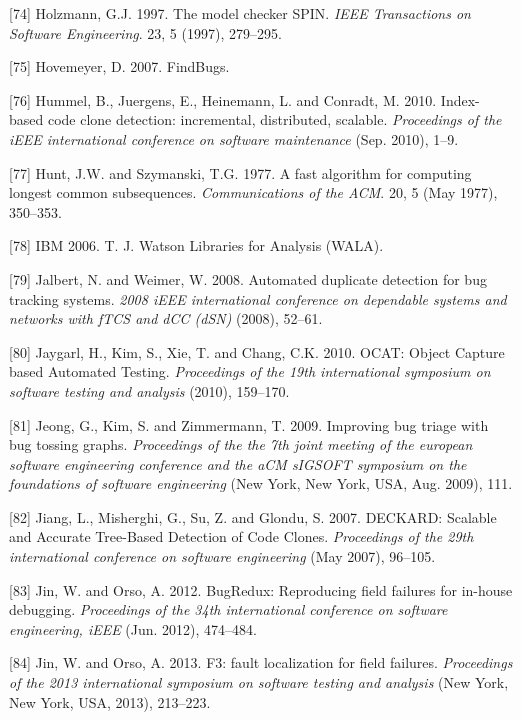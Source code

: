 \documentclass[12pt]{report}
\begin{document}
\hypertarget{ref-holzmann1997model}{}
{[}74{]} Holzmann, G.J. 1997. The model checker SPIN. \emph{IEEE
Transactions on Software Engineering}. 23, 5 (1997), 279--295.

\hypertarget{ref-Hovemeyer2007}{}
{[}75{]} Hovemeyer, D. 2007. FindBugs.

\hypertarget{ref-Hummel2010}{}
{[}76{]} Hummel, B., Juergens, E., Heinemann, L. and Conradt, M. 2010.
Index-based code clone detection: incremental, distributed, scalable.
\emph{Proceedings of the iEEE international conference on software
maintenance} (Sep. 2010), 1--9.

\hypertarget{ref-Hunt1977}{}
{[}77{]} Hunt, J.W. and Szymanski, T.G. 1977. A fast algorithm for
computing longest common subsequences. \emph{Communications of the ACM}.
20, 5 (May 1977), 350--353.

\hypertarget{ref-IBM2006}{}
{[}78{]} IBM 2006. T. J. Watson Libraries for Analysis (WALA).

\hypertarget{ref-Jalbert2008}{}
{[}79{]} Jalbert, N. and Weimer, W. 2008. Automated duplicate detection
for bug tracking systems. \emph{2008 iEEE international conference on
dependable systems and networks with fTCS and dCC (dSN)} (2008), 52--61.

\hypertarget{ref-Jaygarl}{}
{[}80{]} Jaygarl, H., Kim, S., Xie, T. and Chang, C.K. 2010. OCAT:
Object Capture based Automated Testing. \emph{Proceedings of the 19th
international symposium on software testing and analysis} (2010),
159--170.

\hypertarget{ref-Jeong2009}{}
{[}81{]} Jeong, G., Kim, S. and Zimmermann, T. 2009. Improving bug
triage with bug tossing graphs. \emph{Proceedings of the the 7th joint
meeting of the european software engineering conference and the aCM
sIGSOFT symposium on the foundations of software engineering} (New York,
New York, USA, Aug. 2009), 111.

\hypertarget{ref-Jiang2007}{}
{[}82{]} Jiang, L., Misherghi, G., Su, Z. and Glondu, S. 2007. DECKARD:
Scalable and Accurate Tree-Based Detection of Code Clones.
\emph{Proceedings of the 29th international conference on software
engineering} (May 2007), 96--105.

\hypertarget{ref-Jin2012}{}
{[}83{]} Jin, W. and Orso, A. 2012. BugRedux: Reproducing field failures
for in-house debugging. \emph{Proceedings of the 34th international
conference on software engineering, iEEE} (Jun. 2012), 474--484.

\hypertarget{ref-Jin2013}{}
{[}84{]} Jin, W. and Orso, A. 2013. F3: fault localization for field
failures. \emph{Proceedings of the 2013 international symposium on
software testing and analysis} (New York, New York, USA, 2013),
213--223.
\end{document}
